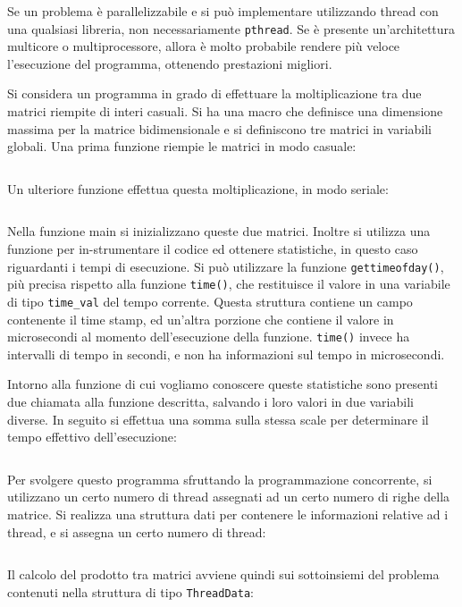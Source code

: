 \documentclass{article}
\numberwithin{equation}{subsection}
\begin{document}
Se un problema è parallelizzabile e si può implementare utilizzando thread con una qualsiasi libreria, non necessariamente \verb|pthread|. Se è presente un'architettura multicore o multiprocessore, allora è molto probabile rendere più veloce 
l'esecuzione del programma, ottenendo prestazioni migliori.  


Si considera un programma in grado di effettuare la moltiplicazione tra due matrici riempite di interi casuali. Si ha una macro che definisce una dimensione massima per 
la matrice bidimensionale e si definiscono tre matrici in variabili globali. 
Una prima funzione riempie le matrici in modo casuale:
\inputminted[firstline=1, lastline=15]{c}{./"Programmazione Concorrente"/single.c}
Un ulteriore funzione effettua questa moltiplicazione, in modo seriale:
\inputminted[firstline=17, lastline=24]{c}{./"Programmazione Concorrente"/single.c}

Nella funzione main si inizializzano queste due matrici. Inoltre si utilizza una funzione per in-strumentare il codice ed ottenere statistiche, in questo caso 
riguardanti i tempi di esecuzione. Si può utilizzare la funzione \texttt{gettimeofday()}, più precisa rispetto alla funzione \verb|time()|, 
che restituisce il valore in una variabile di tipo \verb|time_val| del tempo corrente. Questa struttura contiene un campo contenente il time stamp, ed un'altra porzione che 
contiene il valore in microsecondi al momento dell'esecuzione della funzione. 
\verb|time()| invece ha intervalli di tempo in secondi, e non ha informazioni sul 
tempo in microsecondi. 

Intorno alla funzione di cui vogliamo conoscere queste statistiche sono presenti 
due chiamata alla funzione descritta, salvando i loro valori in due variabili diverse. 
In seguito si effettua una somma sulla stessa scale per determinare il tempo effettivo 
dell'esecuzione:
\inputminted[firstline=26, lastline=42]{c}{./"Programmazione Concorrente"/single.c}


Per svolgere questo programma sfruttando la 
programmazione concorrente, si utilizzano un certo numero di thread assegnati ad un certo numero di righe della matrice. 
Si realizza una struttura dati per contenere le informazioni relative ad i thread, e 
si assegna un certo numero di thread:
\inputminted[firstline=1, lastline=19]{c}{./"Programmazione Concorrente"/multi.c}

Il calcolo del prodotto tra matrici avviene quindi sui sottoinsiemi del problema 
contenuti nella struttura di tipo \verb|ThreadData|: 
\inputminted[firstline=27, lastline=36]{c}{./"Programmazione Concorrente"/multi.c}
\end{document}
